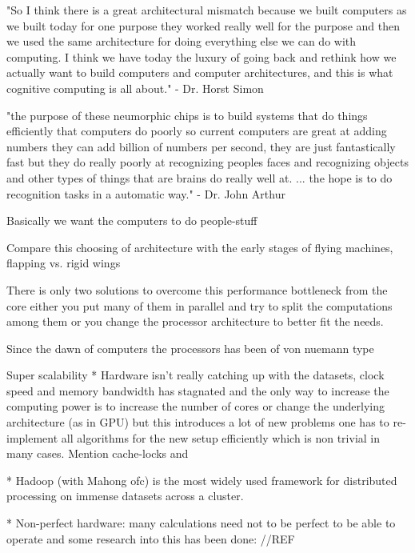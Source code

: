 \documentclass{article}
\begin{document}
    "So I think there is a great architectural mismatch because we built
    computers as we built today for one purpose they worked really well for the
    purpose and then we used the same architecture for doing everything else we
    can do with computing. I think we have today the luxury of going back and
    rethink how we actually want to build computers and computer architectures,
    and this is what cognitive computing is all about." - Dr. Horst Simon

    "the purpose of these neumorphic chips is to build systems that do things 
    efficiently that computers do poorly so current computers are great at
    adding numbers they can add billion of numbers per second, they are just
    fantastically fast but they do really poorly at recognizing peoples faces
    and recognizing objects and other types of things that are brains do really
    well at. ... the hope is to do recognition tasks in a automatic way." - Dr.
    John Arthur

    Basically we want the computers to do people-stuff

    Compare this choosing of architecture with the early stages of flying
    machines, flapping vs. rigid wings
    
    There is only two solutions to overcome this performance bottleneck from the
    core either you put many of them in parallel and try to split the
    computations among them or you change the processor architecture to better
    fit the needs.


    Since the dawn of computers the processors has been of von nuemann type


    Super scalability
    * Hardware isn't really catching up with the datasets, clock speed and
    memory bandwidth has
    stagnated and the only way to increase the computing power is to increase
    the number of cores or change the underlying architecture (as in GPU) but 
    this introduces a lot of new problems one has to re-implement all
    algorithms for the new setup efficiently which is non trivial in many
    cases. Mention cache-locks and

    * Hadoop (with Mahong ofc) is the most widely used framework for
    distributed processing on immense datasets across a cluster. 

    * Non-perfect hardware: many calculations need not to be perfect to be able
    to operate and some research into this has been done: //REF
\end{document}
